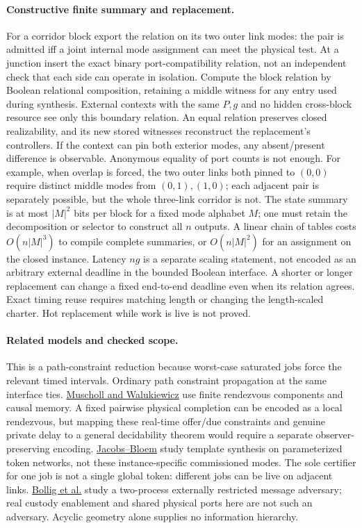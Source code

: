 \documentclass[11pt]{article}
\begin{document}
\paragraph{Constructive finite summary and replacement.}
For a corridor block export the relation on its two outer link
modes: the pair is admitted iff a joint internal mode assignment
can meet the physical test. At a junction insert the exact
binary port-compatibility relation, not an independent check
that each side can operate in isolation. Compute the block
relation by Boolean relational composition, retaining a middle
witness for any entry used during synthesis. External contexts
with the same \(P,g\) and no hidden cross-block resource see only
this boundary relation. An equal relation preserves closed
realizability, and its new stored witnesses reconstruct the
replacement's controllers. If the context can pin both exterior
modes, any absent/present difference is observable.
Anonymous equality of port counts is not enough. For example,
when overlap is forced, the two outer links both pinned to
\((0,0)\) require distinct middle modes from \((0,1),(1,0)\);
each adjacent pair is separately possible, but the whole
three-link corridor is not. The state summary is at most
\(|M|^2\) bits per block for a fixed mode alphabet \(M\);
one must retain the decomposition or selector to construct
all \(n\) outputs. A linear chain of tables costs
\(O(n|M|^3)\) to compile complete summaries, or
\(O(n|M|^2)\) for an assignment on the closed instance.
Latency \(ng\) is a separate scaling statement, not encoded
as an arbitrary external deadline in the bounded Boolean
interface. A shorter or longer replacement can change a fixed
end-to-end deadline even when its relation agrees. Exact
timing reuse requires matching length or changing the
length-scaled charter. Hot replacement while work is live is
not proved.

\paragraph{Related models and checked scope.}
This is a path-constraint reduction because worst-case
saturated jobs force the relevant timed intervals. Ordinary
path constraint propagation at the same interface ties.
\href{https://doi.org/10.4230/LIPIcs.FSTTCS.2014.639}{Muscholl and Walukiewicz}
use finite rendezvous components and causal memory. A fixed
pairwise physical completion can be encoded as a local
rendezvous, but mapping these real-time offer/due constraints
and genuine private delay to a general decidability theorem
would require a separate observer-preserving encoding.
\href{https://lmcs.episciences.org/736}{Jacobs--Bloem} study
template synthesis on parameterized token networks, not these
instance-specific commissioned modes. The sole certifier for
one job is not a single global token: different jobs can be
live on adjacent links. \href{https://arxiv.org/abs/2611.04561}{Bollig et al.}
study a two-process externally restricted message adversary;
real custody enablement and shared physical ports here are
not such an adversary. Acyclic geometry alone supplies no
information hierarchy.
\end{document}
